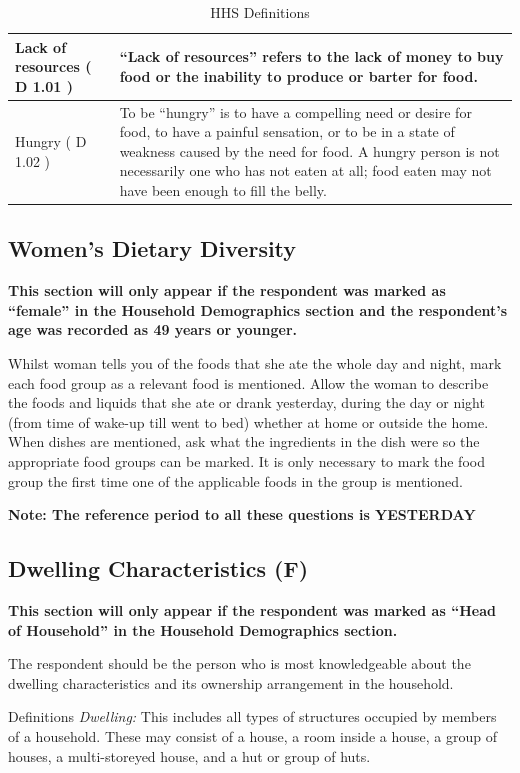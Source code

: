 \documentclass[a4paper]{refart}
\newenvironment{fulltable}[1][tbp]
 {\begin{table}[#1]%
  \hspace*{-\leftmarginwidth}%
  \begin{minipage}{\fullwidth}}
 {\end{minipage}\end{table}}
\begin{document}
\begin{fulltable}
\begin{tabularx}{\textwidth}{| X | X |}
Lack of resources ( D 1.01 ) &
``Lack of resources'' refers to the lack of money to buy food or the inability to produce or barter for food. \\ \hline
Hungry ( D 1.02 ) &
To be “hungry” is to have a compelling need or desire for food, to have a painful sensation, or to be in a state of weakness caused by the need for food. A hungry person is not necessarily one who has not eaten at all; food eaten may not have been enough to fill the belly. \\ \hline
\end{tabularx}
\caption{HHS Definitions}
\label{hhstable}
\end{fulltable}

\subsection{Women's Dietary Diversity}
\textbf{This section will only appear if the respondent was marked as ``female'' in the Household Demographics section and the respondent's age was recorded as 49 years or younger.}

Whilst woman tells you of the foods that she ate the whole day and night, mark each food group as a relevant food is mentioned. Allow the  woman to describe the foods and liquids that she ate or drank yesterday, during the day or night (from time of wake-up till went to bed) whether at home or outside the home. When dishes are mentioned, ask what the ingredients in the dish were so the appropriate food groups can be marked. It is only necessary to mark the food group the first time one of the applicable foods in the group is mentioned.

\textbf{Note: The reference period to all these questions is YESTERDAY}

\subsection{Dwelling Characteristics (F)}
\textbf{This section will only appear if the respondent was marked as ``Head of Household'' in the Household Demographics section.}

The respondent should be the person who is most knowledgeable about the dwelling characteristics and its ownership arrangement in the household.

Definitions
\textit{Dwelling:} This includes all types of structures occupied by members of a household. These may consist of a house, a room inside a house, a group of houses, a multi-storeyed house, and a hut or group of huts.
\end{document}

